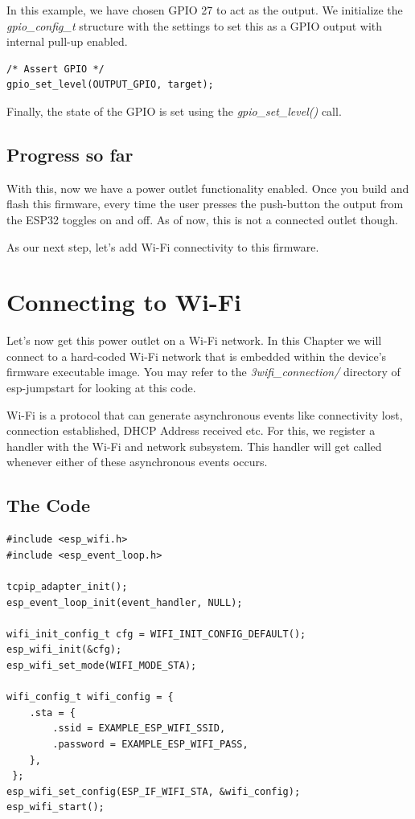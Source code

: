 \documentclass[11pt,fleqn]{book} %
\begin{document}
In this example, we have chosen GPIO 27 to act as the output. We initialize the \textit{gpio\_config\_t} structure with the settings to set this as a GPIO output with internal pull-up enabled.

\begin{verbatim}
/* Assert GPIO */
gpio_set_level(OUTPUT_GPIO, target);

\end{verbatim}

Finally, the state of the GPIO is set using the \textit{gpio\_set\_level()} call.

\section{Progress so far}
With this, now we have a power outlet functionality enabled. Once you build and flash this firmware, every time the user presses the push-button the output from the ESP32 toggles on and off. As of now, this is not a connected outlet though. 

As our next step, let's add Wi-Fi connectivity to this firmware.



\chapter{Connecting to Wi-Fi}
Let's now get this power outlet on a Wi-Fi network. In this Chapter we will connect to a hard-coded Wi-Fi network that is embedded within the device's firmware executable image. You may refer to the \textit{3wifi\_connection/} directory of esp-jumpstart for looking at this code.

Wi-Fi is a protocol that can generate asynchronous events like connectivity lost, connection established, DHCP Address received etc. For this, we register a handler with the Wi-Fi and network subsystem. This handler will get called whenever either of these asynchronous events occurs.

\section{The Code}
\begin{verbatim}
#include <esp_wifi.h>
#include <esp_event_loop.h>

tcpip_adapter_init();
esp_event_loop_init(event_handler, NULL);

wifi_init_config_t cfg = WIFI_INIT_CONFIG_DEFAULT();
esp_wifi_init(&cfg);
esp_wifi_set_mode(WIFI_MODE_STA);

wifi_config_t wifi_config = {
    .sta = {
        .ssid = EXAMPLE_ESP_WIFI_SSID,
        .password = EXAMPLE_ESP_WIFI_PASS,
    },
 };
esp_wifi_set_config(ESP_IF_WIFI_STA, &wifi_config);
esp_wifi_start();

\end{verbatim}
\end{document}
